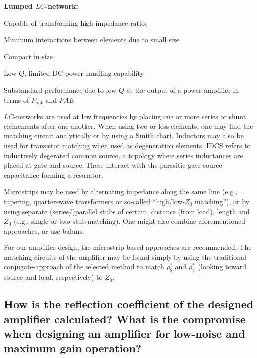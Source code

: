 \documentclass[a4paper, 12pt]{article}
\newlength{\oneLine}
\begin{document}
\noindent\textbf{Lumped \boldmath$LC$\unboldmath-network:}
\vspace*{-0.5\oneLine}
\begin{description}[font=\rmfamily\mdseries, leftmargin=15mm, style=sameline, align=right, labelsep=5mm, itemsep=-2pt]
	\item[\boldmath$+$\unboldmath]	Capable of transforming high impedance ratios
	\item[\boldmath$+$\unboldmath] 	Minimum interactions between elements due to small size
	\item[\boldmath$+$\unboldmath] 	Compact in size
	\item[\boldmath$-$\unboldmath] 	Low $Q$, limited DC power handling capability	
	\item[\boldmath$-$\unboldmath] 	Substandard performance due to low $Q$ at the output of a power amplifier in terms of $P_\mathrm{out}$ and $\mathit{PAE}$
\end{description}

$LC$-networks are used at low frequencies by placing one or more series or shunt elemements after 
one another. When using two or less elements, one may find the matching circuit analytically or 
by using a Smith chart. Inductors may also be used for transistor matching when used as degeneration 
elements. IDCS refers to inductively degerated common source, a topology where series inductances 
are placed at gate and source. These interact with the parasitic gate-source capacitance forming 
a resonator.

Microstrips may be used by alternating impedance along the same line 
(e.g., tapering, quarter-wave transformers or so-called ``high/low-$Z_0$ matching''), or by 
using separate (series/)parallel stubs of certain, distance (from load), length and $Z_0$ (e.g., 
single or two-stub matching). One might also combine aforementioned approaches, or use baluns.

For our amplifier design, the microstrip based approaches are recommended. 
The matching circuits of the amplifier may be found simply by using the traditional conjugate-approach 
of the selected method to match $\rho_\mathrm{S}^*$ and $\rho_\mathrm{L}^*$ (looking toward 
source and load, respectively) to $Z_0$.


\subsection{How is the reflection coefficient of the designed amplifier calculated? 
	What is the compromise when designing an amplifier for low-noise and maximum gain operation?}
\end{document}
